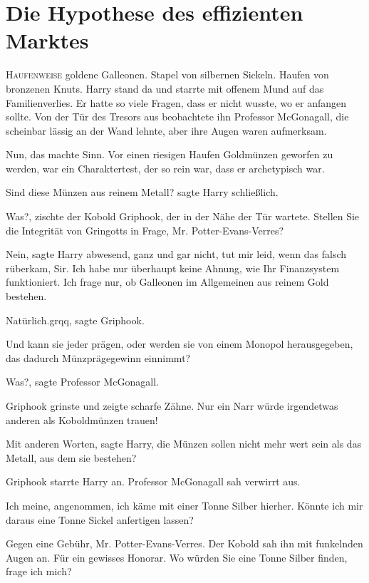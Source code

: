 \chapter{Die Hypothese des effizienten Marktes}

\lettrine{H}{aufenweise} goldene Galleonen. Stapel von silbernen Sickeln. Haufen
von bronzenen Knuts. Harry stand da und starrte mit offenem Mund auf das
Familienverlies. Er hatte so viele Fragen, dass er nicht wusste, wo er anfangen
sollte. Von der Tür des Tresors aus beobachtete ihn Professor McGonagall, die
scheinbar lässig an der Wand lehnte, aber ihre Augen waren aufmerksam.

Nun, das machte Sinn. Vor einen riesigen Haufen Goldmünzen geworfen zu werden,
war ein Charaktertest, der so rein war, dass er archetypisch war.

\glqq Sind diese Münzen aus reinem Metall?\grqq{} sagte Harry schließlich.

\glqq Was?\grqq{}, zischte der Kobold Griphook, der in der Nähe der Tür wartete.
\glqq Stellen Sie die Integrität von Gringotts in Frage, Mr.
Potter-Evans-Verres?\grqq{}

\glqq Nein\grqq{}, sagte Harry abwesend, \glqq ganz und gar nicht, tut mir leid,
wenn das falsch rüberkam, Sir. Ich habe nur überhaupt keine Ahnung, wie Ihr
Finanzsystem funktioniert. Ich frage nur, ob Galleonen im Allgemeinen aus reinem
Gold bestehen.\grqq{}

\glqq Natürlich\grqq{}.grqq{}, sagte Griphook.

\glqq Und kann sie jeder prägen, oder werden sie von einem Monopol
herausgegeben, das dadurch Münzprägegewinn einnimmt?\grqq{}

\glqq Was?\grqq{}, sagte Professor McGonagall.

Griphook grinste und zeigte scharfe Zähne. \glqq Nur ein Narr würde irgendetwas
anderen als Koboldmünzen trauen!\grqq{}

\glqq Mit anderen Worten\grqq{}, sagte Harry, \glqq die Münzen sollen nicht mehr
wert sein als das Metall, aus dem sie bestehen?\grqq{}

Griphook starrte Harry an. Professor McGonagall sah verwirrt aus.

\glqq Ich meine, angenommen, ich käme mit einer Tonne Silber hierher. Könnte ich
mir daraus eine Tonne Sickel anfertigen lassen?\grqq{}

\glqq Gegen eine Gebühr, Mr. Potter-Evans-Verres.\grqq{} Der Kobold sah ihn mit
funkelnden Augen an. \glqq Für ein gewisses Honorar. Wo würden Sie eine Tonne
Silber finden, frage ich mich?\grqq{}


